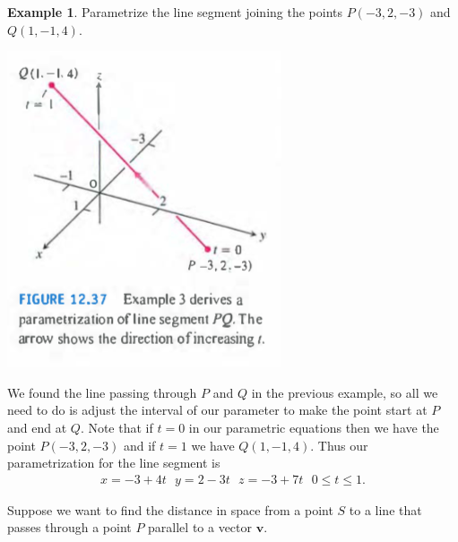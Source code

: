 \documentclass[12pt, letter]{article}
\theoremstyle{plain}
\numberwithin{theorem}{section}
\theoremstyle{definition}
\newtheorem{example}[theorem]{Example}
\begin{document}
\bigskip

\hrulefill

\bigskip

\begin{example}
Parametrize the line segment joining the points $P(-3,2,-3)$ and $Q(1,-1,4)$.\\

\bigskip

\begin{center}
\includegraphics[scale=0.7]{m1_f15}
\end{center}

\bigskip

We found the line passing through $P$ and $Q$ in the previous example, so all we need to do is adjust the interval of our parameter to make the point start at $P$ and end at $Q$. Note that if $t=0$ in our parametric equations then we have the point $P(-3,2,-3)$ and if $t=1$ we have $Q(1,-1,4)$. Thus our parametrization for the line segment is
\begin{align*}
x= -3+4t \ \ \ y=2-3t \ \ \ z=-3+7t \ \ \ 0 \leq t \leq 1.
\end{align*}
\end{example}

\bigskip

\hrulefill

\bigskip

Suppose we want to find the distance in space from a point $S$ to a line that passes through a point $P$ parallel to a vector $\bm{v}$.

\bigskip
\end{document}
